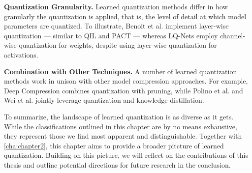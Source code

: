 \textbf{Quantization Granularity.} 
Learned quantization methods differ in how granularly the quantization is applied, 
that is, the level of detail at which model parameters are quantized. 
To illustrate, Benoit et al. \cite{jacob2018quantization} implement layer-wise quantization  — 
similar to QIL \cite{DBLP:conf/cvpr/JungSLSHKHC19} and PACT \cite{DBLP:journals/corr/abs-1805-06085}  — 
whereas LQ-Nets \cite{DBLP:conf/eccv/ZhangYYH18} employ channel-wise quantization for weights, 
despite using layer-wise quantization for activations.

\textbf{Combination with Other Techniques.} 
A number of learned quantization methods work in unison with other model compression approaches.
For example, Deep Compression \cite{han2016deepcompression} combines quantization with pruning, while 
Polino et al. \cite{polino2018modelcompression} and Wei et al. \cite{DBLP:conf/eccv/WeiPQOY18} 
jointly leverage quantization and knowledge distillation.

To summarize, the landscape of learned quantization is as diverse as it gets.
While the classifications outlined in this chapter are by no means exhaustive, 
they represent those we find most apparent and distinguishable.
Together with \cref{cha:chapter2}, 
this chapter aims to provide a broader pitcture of learned quantization. 
Building on this picture,
we will reflect on the contributions of this thesis and outline potential directions for future research in the conclusion.

